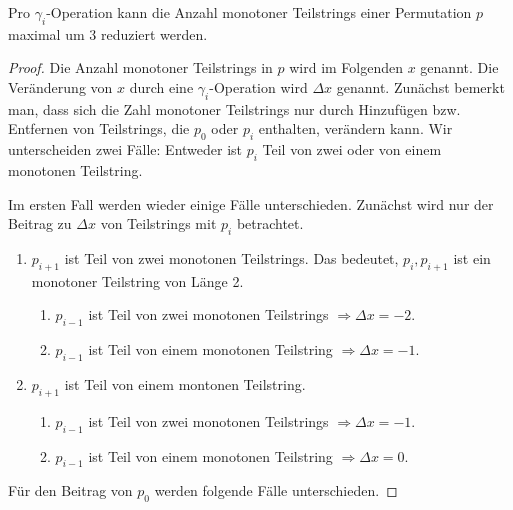 \documentclass[a4paper, 11pt, ngerman]{article}
\begin{document}
\begin{lemma}
    Pro $\gamma_i$-Operation kann die Anzahl monotoner Teilstrings einer Permutation $p$ maximal um 3 reduziert werden.
\end{lemma}

\begin{proof}
    Die Anzahl monotoner Teilstrings in $p$ wird im Folgenden $x$ genannt. Die Veränderung von $x$ durch eine $\gamma_i$-Operation wird $\Delta x$ genannt. Zunächst bemerkt man, dass sich die Zahl monotoner Teilstrings nur durch Hinzufügen bzw. Entfernen von Teilstrings, die $p_0$ oder $p_i$ enthalten, verändern kann. Wir unterscheiden zwei Fälle: Entweder ist $p_i$ Teil von zwei oder von einem monotonen Teilstring.

    Im ersten Fall werden wieder einige Fälle unterschieden. Zunächst wird nur der Beitrag zu $\Delta x$ von Teilstrings mit $p_i$ betrachtet.

    \begin{enumerate}
        \item $p_{i + 1}$ ist Teil von zwei monotonen Teilstrings. Das bedeutet, $p_i, p_{i + 1}$ ist ein monotoner Teilstring von Länge 2.
              \begin{enumerate}
                  \item $p_{i - 1}$ ist Teil von zwei monotonen Teilstrings $\Longrightarrow \Delta x = - 2$.
                  \item $p_{i - 1}$ ist Teil von einem monotonen Teilstring $\Longrightarrow \Delta x = - 1$.
              \end{enumerate}
        \item $p_{i + 1}$ ist Teil von einem montonen Teilstring.
              \begin{enumerate}
                  \item $p_{i - 1}$ ist Teil von zwei monotonen Teilstrings $\Longrightarrow \Delta x = - 1$.
                  \item $p_{i - 1}$ ist Teil von einem monotonen Teilstring $\Longrightarrow \Delta x = 0$.
              \end{enumerate}
    \end{enumerate}

    \noindent   Für den Beitrag von $p_0$ werden folgende Fälle unterschieden.


\end{proof}
\end{document}
